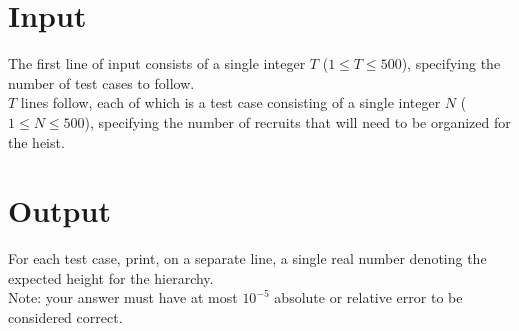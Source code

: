 \section*{Input}
The first line of input consists of a single integer $T$ ($1 \leq T \leq 500$), specifying the number of test cases to follow.\\
$T$ lines follow, each of which is a test case consisting of a single integer $N$ ($1 \leq N \leq 500$), specifying the number of recruits that will need to be organized for the heist.\\

\section*{Output}
For each test case, print, on a separate line, a single real number denoting the expected height for the hierarchy.\\
Note: your answer must have at most $10^{-5}$ absolute or relative error to be considered correct.
